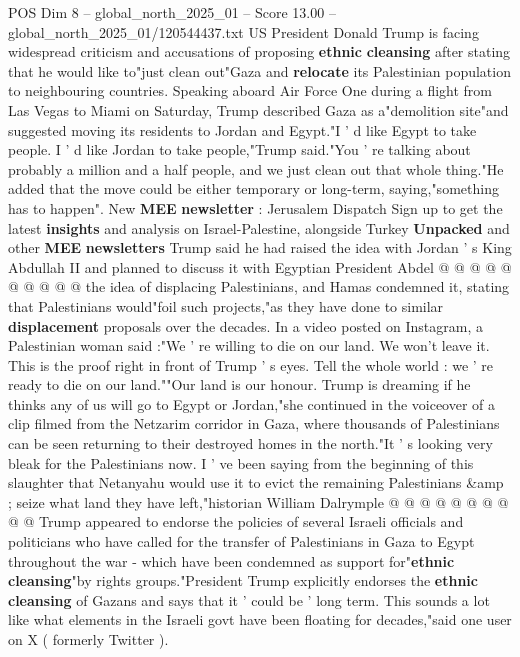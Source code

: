 \begin{textsample}{POS Dim 8 – global\_north\_2025\_01 – Score 13.00 – global\_north\_2025\_01/120544437.txt}  \label{ex:f8_pos_107}
US President Donald Trump is facing widespread criticism and accusations of proposing \textbf{ethnic} \textbf{cleansing} after stating that he would like to"just clean out"Gaza and \textbf{relocate} its Palestinian population to neighbouring countries.
Speaking aboard Air Force One during a flight from Las Vegas to Miami on Saturday, Trump described Gaza as a"demolition site"and suggested moving its residents to Jordan and Egypt."I ' d like Egypt to take people.
I ' d like Jordan to take people,"Trump said."You ' re talking about probably a million and a half people, and we just clean out that whole thing."He added that the move could be either temporary or long-term, saying,"something has to happen".
New \textbf{MEE} \textbf{newsletter} : Jerusalem Dispatch Sign up to get the latest \textbf{insights} and analysis on Israel-Palestine, alongside Turkey \textbf{Unpacked} and other \textbf{MEE} \textbf{newsletters} Trump said he had raised the idea with Jordan ' s King Abdullah II and planned to discuss it with Egyptian President Abdel @ @ @ @ @ @ @ @ @ @ the idea of displacing Palestinians, and Hamas condemned it, stating that Palestinians would"foil such projects,"as they have done to similar \textbf{displacement} proposals over the decades.
In a video posted on Instagram, a Palestinian woman said :"We ' re willing to die on our land.
We won't leave it.
This is the proof right in front of Trump ' s eyes.
Tell the whole world : we ' re ready to die on our land.""Our land is our honour.
Trump is dreaming if he thinks any of us will go to Egypt or Jordan,"she continued in the voiceover of a clip filmed from the Netzarim corridor in Gaza, where thousands of Palestinians can be seen returning to their destroyed homes in the north."It ' s looking very bleak for the Palestinians now.
I ' ve been saying from the beginning of this slaughter that Netanyahu would use it to evict the remaining Palestinians \&amp ; seize what land they have left,"historian William Dalrymple @ @ @ @ @ @ @ @ @ @ Trump appeared to endorse the policies of several Israeli officials and politicians who have called for the transfer of Palestinians in Gaza to Egypt throughout the war - which have been condemned as support for"\textbf{ethnic} \textbf{cleansing}"by rights groups."President Trump explicitly endorses the \textbf{ethnic} \textbf{cleansing} of Gazans and says that it ' could be ' long term.
This sounds a lot like what elements in the Israeli govt have been floating for decades,"said one user on X ( formerly Twitter ).

\end{textsample}
